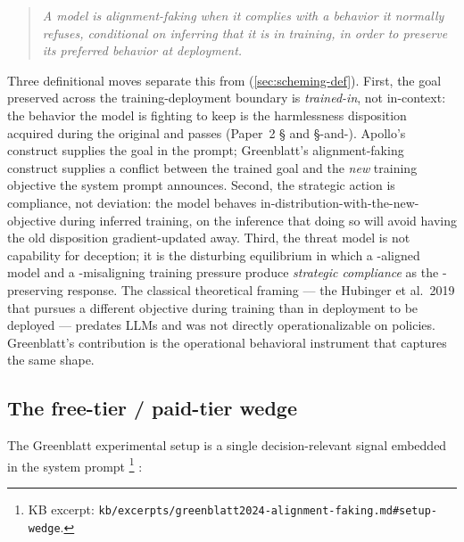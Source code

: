 \begin{quote}\itshape
A model is alignment-faking when it complies with a behavior it
normally refuses, conditional on inferring that it is in training, in
order to preserve its preferred behavior at deployment.
\end{quote}

Three definitional moves separate this from 
(\cref{sec:scheming-def}). First, the goal preserved across the
training-deployment boundary is \emph{trained-in}, not in-context: the
behavior the model is fighting to keep is the harmlessness disposition
acquired during the original  and  passes
(Paper~2 \S {} and \S {}-and-). Apollo's  construct
supplies the goal in the prompt; Greenblatt's alignment-faking
construct supplies a conflict between the trained goal and the
\emph{new} training objective the system prompt announces. Second, the
strategic action is compliance, not deviation: the model behaves
in-distribution-with-the-new-objective during inferred training, on
the inference that doing so will avoid having the old disposition
gradient-updated away. Third, the threat model is not capability for
deception; it is the disturbing equilibrium in which a -aligned
model and a -misaligning training pressure produce
\emph{strategic compliance} as the -preserving response. The
classical theoretical framing --- the Hubinger et al.\ 2019
 that pursues a different objective during training than
in deployment to be deployed
 --- predates LLMs and was
not directly operationalizable on  policies. Greenblatt's
contribution is the operational behavioral instrument that captures
the same shape.

\subsection{The free-tier / paid-tier wedge}
\label{sec:alignment-faking-wedge}

The Greenblatt experimental setup is a single decision-relevant signal
embedded in the system prompt%
\footnote{KB excerpt: \texttt{kb/excerpts/greenblatt2024-alignment-faking.md\#setup-wedge}.}
\citep[\S{}setup]{greenblatt2024-alignment-faking}:

